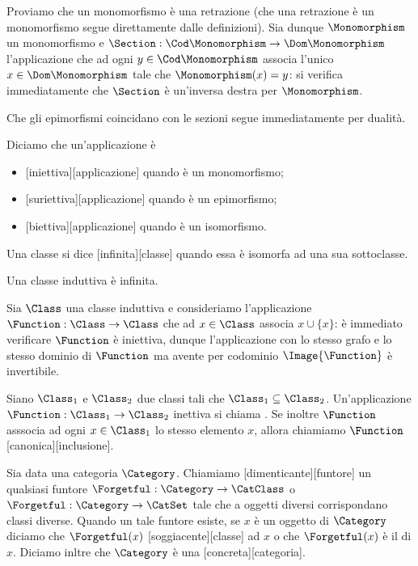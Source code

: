 \par Proviamo che un monomorfismo \`e una retrazione (che una retrazione
\`e un monomorfismo segue direttamente dalle definizioni). Sia dunque
$\Monomorphism$ un monomorfismo e $\Section: \Cod \Monomorphism
\rightarrow \Dom \Monomorphism$ l'applicazione che ad ogni $y \in
\Cod \Monomorphism$ associa l'unico $x \in \Dom \Monomorphism$ tale che
$\Monomorphism(x) = y$: si verifica immediatamente che $\Section$ \`e
un'inversa destra per $\Monomorphism$.
\par Che gli epimorfismi coincidano con le sezioni segue immediatamente
per dualit\`a. \EndProof
\begin{Definition}
	Diciamo che un'applicazione \`e
	\begin{itemize}
		\item {}[iniettiva][applicazione] quando \`e un monomorfismo;
		\item {}[suriettiva][applicazione] quando \`e un epimorfismo;
		\item {}[biettiva][applicazione] quando \`e un isomorfismo.
	\end{itemize}
\end{Definition}
\begin{Definition}
	Una classe si dice [infinita][classe] quando essa \`e isomorfa ad una sua sottoclasse.
\end{Definition}
\begin{Theorem}
	Una classe induttiva \`e infinita.
\end{Theorem}
\Proof Sia $\Class$ una classe induttiva e consideriamo l'applicazione $\Function: \Class \rightarrow \Class$ che ad $x \in \Class$ associa $x \cup \lbrace x \rbrace$: \`e immediato verificare $\Function$ \`e iniettiva, dunque l'applicazione con lo stesso grafo e lo stesso dominio di $\Function$ ma avente per codominio $\Image{\Function}$ \`e invertibile. \EndProof 
\begin{Definition}
	Siano $\Class_1$ e $\Class_2$ due classi tali che $\Class_1 \subseteq \Class_2$. Un'applicazione $\Function: \Class_1 \rightarrow \Class_2$ inettiva si chiama . Se inoltre $\Function$ asssocia ad ogni $x \in \Class_1$ lo stesso elemento $x$, allora chiamiamo $\Function$ [canonica][inclusione].
\end{Definition}
\begin{Definition}
	Sia data una categoria $\Category$. Chiamiamo [dimenticante][funtore] un qualsiasi funtore $\Forgetful: \Category \rightarrow \CatClass$ o $\Forgetful: \Category \rightarrow \CatSet$ tale che a oggetti diversi corrispondano classi diverse. Quando un tale funtore esiste, se $x$ \`e un oggetto di $\Category$ diciamo che $\Forgetful(x)$ [soggiacente][classe] ad $x$ o che $\Forgetful(x)$ \`e il  di $x$. Diciamo inltre che $\Category$ \`e una [concreta][categoria].
\end{Definition}
